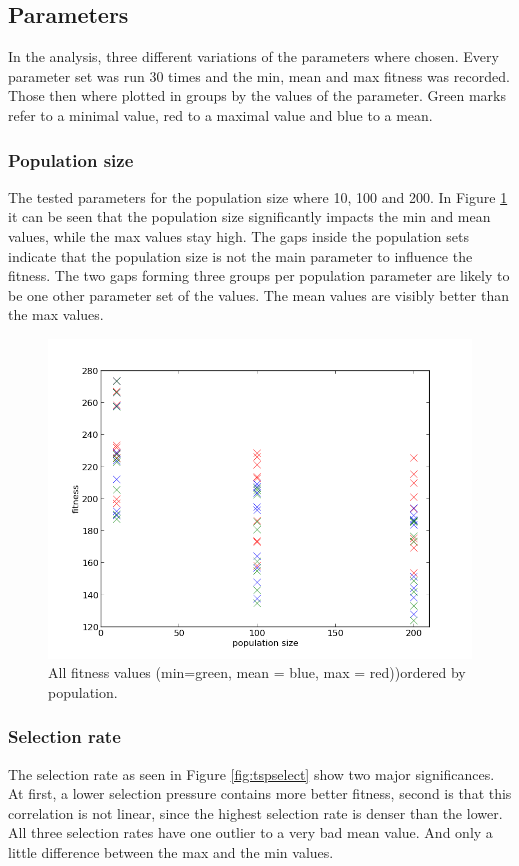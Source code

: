 \documentclass{scrartcl}
\begin{document}
\subsection{Parameters}
In the analysis, three different variations of the parameters where chosen. Every parameter set was run 30 times and the min, mean and max fitness was recorded. Those then where plotted in groups by the values of the parameter. Green marks refer to a minimal value, red to a maximal value and blue to a mean.


\subsubsection{Population size}
The tested parameters for the population size where 10, 100 and 200.
In Figure \ref{fig:tsppop} it can be seen that the population size significantly impacts the min and mean values, while the max values stay high. The gaps inside the population sets indicate that the population size is not the main parameter to influence the fitness. The two gaps forming three groups per population parameter are likely to be one other parameter set of the values. The mean values are visibly better than the max values.

\begin{figure}
 \center
 \includegraphics[width=.5\linewidth]{img/ex3/tsp_fitness_population.png} 
 \caption{All fitness values (min=green, mean = blue, max = red))ordered by population.}
 \label{fig:tsppop}
\end{figure}

\subsubsection{Selection rate} 
The selection rate as seen in Figure \ref{fig:tspselect} show two major significances. At first, a lower selection pressure contains more better fitness, second is that this correlation is not linear, since the highest selection rate is denser than the lower.\\
All three selection rates have one outlier to a very bad mean value. And only a little difference between the max and the min values.
\end{document}
